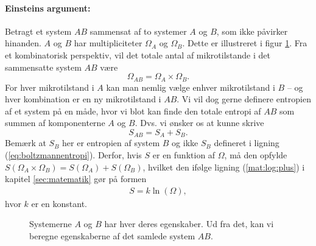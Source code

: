 \paragraph{Einsteins argument:}
Betragt et system $AB$ sammensat af to systemer $A$ og $B$, som ikke påvirker hinanden. $A$ og $B$ har multipliciteter $\Omega_A$ og $\Omega_B$. Dette er illustreret i figur \ref{fig:AB}. Fra et kombinatorisk perspektiv, vil det totale antal af mikrotilstande i det sammensatte system $AB$ være
\[ \Omega_{AB}=\Omega_A\times\Omega_B. \]
For hver mikrotilstand i $A$ kan man nemlig vælge enhver mikrotilstand i $B$ -- og hver kombination er en ny mikrotilstand i $AB$. 
Vi vil dog gerne definere entropien af et system på en måde, hvor vi blot kan finde den totale entropi af $AB$ som summen af komponenterne $A$ og $B$. Dvs. vi ønsker os at kunne skrive%
\[ S_{AB}=S_A+S_B. \]
Bemærk at $S_B$ her er entropien af system $B$ og ikke $S_B$ defineret i ligning (\ref{eq:boltzmannentropi}). Derfor, hvis $S$ er en funktion af $\Omega$, må den opfylde $S(\Omega_A\times\Omega_B)=S(\Omega_A)+S(\Omega_B)$, hvilket den ifølge ligning (\ref{mat:log:plus}) i kapitel \ref{sec:matematik} gør på formen
\begin{align}
    S=k\ln{(\Omega)}, \label{eq:stat:entropi}
\end{align}
hvor $k$ er en konstant.
\begin{figure}[H]
	\centering
	\caption{Systemerne $A$ og $B$ har hver deres egenskaber. Ud fra det, kan vi beregne egenskaberne af det samlede system $AB$.}
	\label{fig:AB}
\end{figure}
